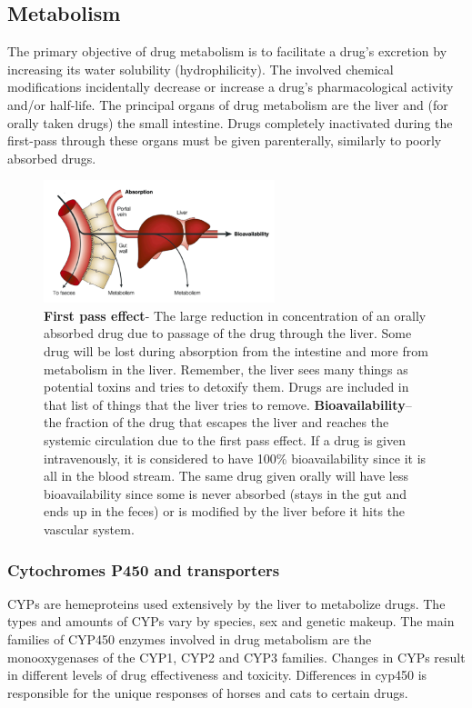 \documentclass{book}
\begin{document}
\subsection{Metabolism}
The primary objective of drug metabolism is to facilitate a drug's excretion by increasing its
water solubility (hydrophilicity). 
The involved chemical modifications incidentally decrease or increase a drug's pharmacological activity and/or half-life.
The principal organs of drug metabolism are the liver and (for orally taken drugs) the small intestine. 
Drugs completely inactivated during the first-pass through these organs must be given parenterally, similarly to poorly absorbed drugs.

\begin{figure}
    \includegraphics[width=0.6\textwidth, center]{images/image6.png}
    \caption{\textbf{First pass effect}- The large reduction in concentration of an orally absorbed drug due to passage of the drug through the liver.  Some drug will be lost during absorption from the intestine and more from metabolism in the liver. Remember, the liver sees many things as potential toxins and tries to detoxify them. Drugs are included in that list of things that the liver tries to remove. \textbf{Bioavailability}– the fraction of the drug that escapes the liver and reaches the systemic circulation due to the first pass effect.  If a drug is given intravenously, it is considered to have 100\% bioavailability since it is all in the blood stream. The same drug given orally will have less bioavailability since some is never absorbed (stays in the gut and ends up in the feces) or is modified by the liver before it hits the vascular system.}
\end{figure}

\subsubsection{Cytochromes P450 and transporters}
CYPs are hemeproteins used extensively by the liver to metabolize drugs. 
The types and amounts of CYPs vary by species, sex and genetic makeup. 
The main families of CYP450 enzymes involved in drug metabolism are the monooxygenases of the CYP1, CYP2 and CYP3 families.
Changes in CYPs result in different levels of drug effectiveness and toxicity. 
Differences in cyp450 is responsible for the unique responses of horses and cats to certain drugs.
\end{document}
